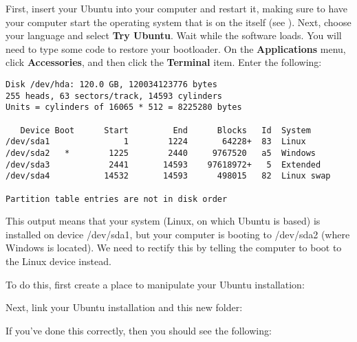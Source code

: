 First, insert your Ubuntu  into your computer and restart it, making sure to have your computer start the operating system that is on the  itself (see ).
Next, choose your language and select \textbf{Try Ubuntu}.
Wait while the software loads.
You will need to type some code to restore your bootloader. On the \textbf{Applications} menu, click \textbf{Accessories}, and then click the \textbf{Terminal} item.
Enter the following:
\begin{terminal}
\prompt {}
\begin{verbatim}
Disk /dev/hda: 120.0 GB, 120034123776 bytes
255 heads, 63 sectors/track, 14593 cylinders
Units = cylinders of 16065 * 512 = 8225280 bytes

   Device Boot      Start         End      Blocks   Id  System
/dev/sda1               1        1224       64228+  83  Linux
/dev/sda2   *        1225        2440     9767520   a5  Windows
/dev/sda3            2441       14593    97618972+   5  Extended
/dev/sda4           14532       14593      498015   82  Linux swap

Partition table entries are not in disk order
\end{verbatim}
\end{terminal}

This output means that your system (Linux, on which Ubuntu is based) is installed on device /dev/sda1, but your computer is booting to /dev/sda2 (where Windows is located).  We need to rectify this by telling the computer to boot to the Linux device instead.

To do this, first create a place to manipulate your Ubuntu installation:

\begin{terminal}
\prompt {}
\end{terminal}

Next, link your Ubuntu installation and this new folder:

\begin{terminal}
\prompt {}
\end{terminal}

If you've done this correctly, then you should see the following:

